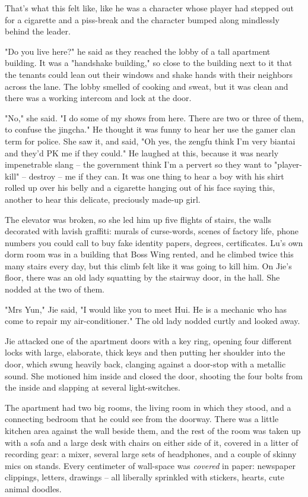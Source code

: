 That's what this felt like, like he was a character whose player
had stepped out for a cigarette and a piss-break and the character
bumped along mindlessly behind the leader.

"Do you live here?" he said as they reached the lobby of a tall
apartment building. It was a "handshake building," so close to the
building next to it that the tenants could lean out their windows
and shake hands with their neighbors across the lane. The lobby
smelled of cooking and sweat, but it was clean and there was a
working intercom and lock at the door.

"No," she said. "I do some of my shows from here. There are two or
three of them, to confuse the jingcha." He thought it was funny to
hear her use the gamer clan term for police. She saw it, and said,
"Oh yes, the zengfu think I'm very biantai and they'd PK me if they
could." He laughed at this, because it was nearly impenetrable
slang -- the government think I'm a pervert so they want to
"player-kill" -- destroy -- me if they can. It was one thing to
hear a boy with his shirt rolled up over his belly and a cigarette
hanging out of his face saying this, another to hear this delicate,
preciously made-up girl.

The elevator was broken, so she led him up five flights of stairs,
the walls decorated with lavish graffiti: murals of curse-words,
scenes of factory life, phone numbers you could call to buy fake
identity papers, degrees, certificates. Lu's own dorm room was in a
building that Boss Wing rented, and he climbed twice this many
stairs every day, but this climb felt like it was going to kill
him. On Jie's floor, there was an old lady squatting by the
stairway door, in the hall. She nodded at the two of them.

"Mrs Yun," Jie said, "I would like you to meet Hui. He is a
mechanic who has come to repair my air-conditioner." The old lady
nodded curtly and looked away.

Jie attacked one of the apartment doors with a key ring, opening
four different locks with large, elaborate, thick keys and then
putting her shoulder into the door, which swung heavily back,
clanging against a door-stop with a metallic sound. She motioned
him inside and closed the door, shooting the four bolts from the
inside and slapping at several light-switches.

The apartment had two big rooms, the living room in which they
stood, and a connecting bedroom that he could see from the doorway.
There was a little kitchen area against the wall beside them, and
the rest of the room was taken up with a sofa and a large desk with
chairs on either side of it, covered in a litter of recording gear:
a mixer, several large sets of headphones, and a couple of skinny
mics on stands. Every centimeter of wall-space was \emph{covered}
in paper: newspaper clippings, letters, drawings -- all liberally
sprinkled with stickers, hearts, cute animal doodles.

